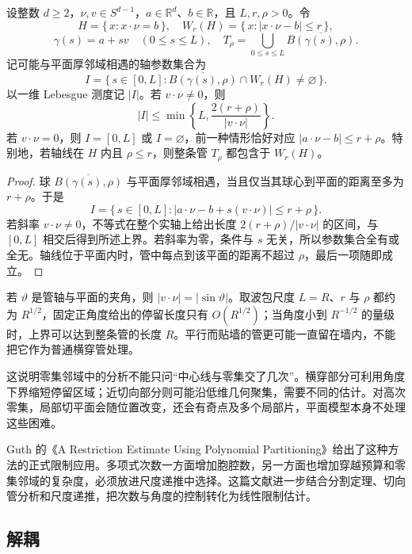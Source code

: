 \begin{proposition}[管与平面厚邻域]\label{b2:prop:25-plane-wall}
设整数 \(d\geq2\)，\(\nu,v\in S^{d-1}\)，\(a\in\mathbb R^d\)、\(b\in\mathbb R\)，且 \(L,r,\rho>0\)。令
\[
 H=\{\,x:x\cdot\nu=b\,\},\quad
 W_r(H)=\{\,x:|x\cdot\nu-b|\leq r\,\},
\]
\[
 \gamma(s)=a+sv\quad(0\leq s\leq L),\quad
 T_\rho=\bigcup_{0\leq s\leq L}\overline{B(\gamma(s),\rho)}.
\]
记可能与平面厚邻域相遇的轴参数集合为
\[
 I=\{\,s\in[0,L]:
       \overline{B(\gamma(s),\rho)}\cap W_r(H)\neq\varnothing\,\}.
\]
以一维 Lebesgue 测度记 \(|I|\)。若 \(v\cdot\nu\neq0\)，则
\[
 |I|\leq\min\left\{L,\frac{2(r+\rho)}{|v\cdot\nu|}\right\}.
\]
若 \(v\cdot\nu=0\)，则 \(I=[0,L]\) 或 \(I=\varnothing\)，前一种情形恰好对应 \(|a\cdot\nu-b|\leq r+\rho\)。特别地，若轴线在 \(H\) 内且 \(\rho\leq r\)，则整条管 \(T_\rho\) 都包含于 \(W_r(H)\)。
\end{proposition}
\begin{proof}
球 \(\overline{B(\gamma(s),\rho)}\) 与平面厚邻域相遇，当且仅当其球心到平面的距离至多为 \(r+\rho\)。于是
\[
 I=\{\,s\in[0,L]:
       |a\cdot\nu-b+s(v\cdot\nu)|\leq r+\rho\,\}.
\]
若斜率 \(v\cdot\nu\neq0\)，不等式在整个实轴上给出长度
\(2(r+\rho)/|v\cdot\nu|\) 的区间，与 \([0,L]\) 相交后得到所述上界。若斜率为零，条件与 \(s\) 无关，所以参数集合全有或全无。轴线位于平面内时，管中每点到该平面的距离不超过 \(\rho\)，最后一项随即成立。
\end{proof}

若 \(\vartheta\) 是管轴与平面的夹角，则 \(|v\cdot\nu|=|\sin\vartheta|\)。取波包尺度 \(L=R\)、\(r\) 与 \(\rho\) 都约为 \(R^{1/2}\)，固定正角度给出的停留长度只有 \(O(R^{1/2})\)；当角度小到 \(R^{-1/2}\) 的量级时，上界可以达到整条管的长度 \(R\)。平行而贴墙的管更可能一直留在墙内，不能把它作为普通横穿管处理。

\ProseParagraphBreak
这说明零集邻域中的分析不能只问“中心线与零集交了几次”。横穿部分可利用角度下界缩短停留区域；近切向部分则可能沿低维几何聚集，需要不同的估计。对高次零集，局部切平面会随位置改变，还会有奇点及多个局部片，平面模型本身不处理这些困难。

\ProseParagraphBreak
Guth 的《A Restriction Estimate Using Polynomial Partitioning》\cite{Guth2016Restriction}给出了这种方法的正式限制应用。多项式次数一方面增加胞腔数，另一方面也增加穿越预算和零集邻域的复杂度，必须放进尺度递推中选择。这篇文献进一步结合分割定理、切向管分析和尺度递推，把次数与角度的控制转化为线性限制估计。

\subsection{解耦}
\label{b2:subsec:250504}

